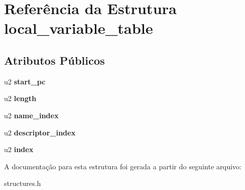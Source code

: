 \hypertarget{structlocal__variable__table}{}\section{Referência da Estrutura local\+\_\+variable\+\_\+table}
\label{structlocal__variable__table}
\subsection*{Atributos Públicos}
\begin{DoxyCompactItemize}
\item 
\mbox{\label{structlocal__variable__table_aa86e910619df9b3284535529bc887a12}} 
u2 {\bfseries start\+\_\+pc}
\item 
\mbox{\label{structlocal__variable__table_a76b778cea6d99b0854cba21e223569cc}} 
u2 {\bfseries length}
\item 
\mbox{\label{structlocal__variable__table_a6c91f7b672683a35b1433c429de69069}} 
u2 {\bfseries name\+\_\+index}
\item 
\mbox{\label{structlocal__variable__table_adb823a30762d64e9d20f674ae7923bfc}} 
u2 {\bfseries descriptor\+\_\+index}
\item 
\mbox{\label{structlocal__variable__table_af13a15b5fbb398323997b88d341a6c38}} 
u2 {\bfseries index}
\end{DoxyCompactItemize}


A documentação para esta estrutura foi gerada a partir do seguinte arquivo\+:\begin{DoxyCompactItemize}
\item 
structures.\+h\end{DoxyCompactItemize}

